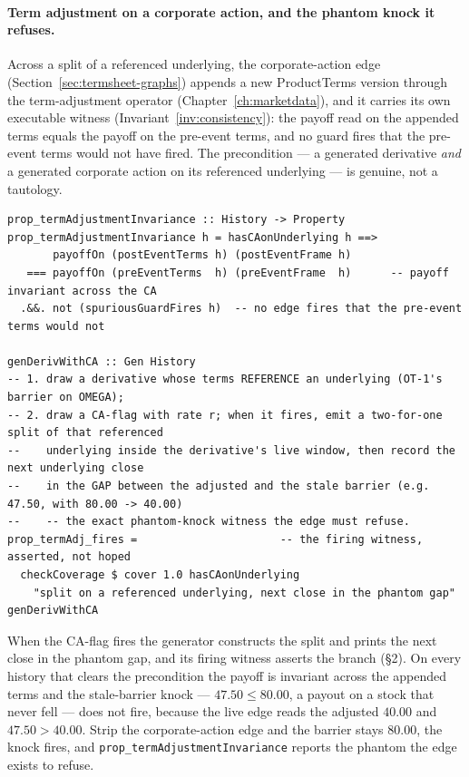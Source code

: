 \documentclass[11pt,a4paper]{article}
\begin{document}
\paragraph{Term adjustment on a corporate action, and the phantom knock it refuses.}
Across a split of a referenced underlying, the corporate-action edge
(Section~\ref{sec:termsheet-graphs}) appends a new ProductTerms version through the
term-adjustment operator (Chapter~\ref{ch:marketdata}), and it carries its own executable
witness (Invariant~\ref{inv:consistency}): the payoff read on the appended terms equals the
payoff on the pre-event terms, and no guard fires that the pre-event terms would not have
fired. The precondition --- a generated derivative \emph{and} a generated corporate action
on its referenced underlying --- is genuine, not a tautology.

\begin{lstlisting}
prop_termAdjustmentInvariance :: History -> Property
prop_termAdjustmentInvariance h = hasCAonUnderlying h ==>
       payoffOn (postEventTerms h) (postEventFrame h)
   === payoffOn (preEventTerms  h) (preEventFrame  h)      -- payoff invariant across the CA
  .&&. not (spuriousGuardFires h)  -- no edge fires that the pre-event terms would not

genDerivWithCA :: Gen History
-- 1. draw a derivative whose terms REFERENCE an underlying (OT-1's barrier on OMEGA);
-- 2. draw a CA-flag with rate r; when it fires, emit a two-for-one split of that referenced
--    underlying inside the derivative's live window, then record the next underlying close
--    in the GAP between the adjusted and the stale barrier (e.g. 47.50, with 80.00 -> 40.00)
--    -- the exact phantom-knock witness the edge must refuse.
prop_termAdj_fires =                      -- the firing witness, asserted, not hoped
  checkCoverage $ cover 1.0 hasCAonUnderlying
    "split on a referenced underlying, next close in the phantom gap" genDerivWithCA
\end{lstlisting}

When the CA-flag fires the generator constructs the split and prints the next close in the
phantom gap, and its firing witness asserts the branch (\S 2). On every history that clears
the precondition the payoff is invariant across the appended terms and the stale-barrier
knock --- $47.50 \le 80.00$, a payout on a stock that never fell --- does not fire, because
the live edge reads the adjusted $40.00$ and $47.50 > 40.00$. Strip the corporate-action edge
and the barrier stays $80.00$, the knock fires, and \texttt{prop\_termAdjustmentInvariance}
reports the phantom the edge exists to refuse.
\end{document}
